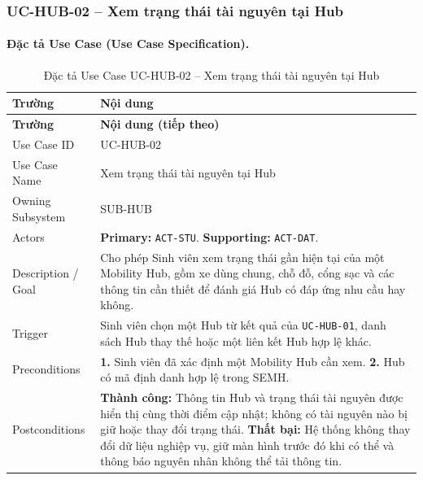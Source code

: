 \clearpage
\subsubsection{UC-HUB-02 -- Xem trạng thái tài nguyên tại Hub}


\paragraph{Đặc tả Use Case (Use Case Specification).}
\small
\begin{longtable}{|L{42mm}|L{102mm}|}
  \caption{Đặc tả Use Case UC-HUB-02 -- Xem trạng thái tài nguyên tại Hub}\label{tab:spec-UC-HUB-02}\\
  \hline
  \centering\arraybackslash\textbf{Trường} & \centering\arraybackslash\textbf{Nội dung}\\
  \hline
  \endfirsthead
  \hline
  \centering\arraybackslash\textbf{Trường} & \centering\arraybackslash\textbf{Nội dung (tiếp theo)}\\
  \hline
  \endhead
  Use Case ID & UC-HUB-02\\\hline
  Use Case Name & Xem trạng thái tài nguyên tại Hub\\\hline
  Owning Subsystem & SUB-HUB\\\hline
  Actors & \textbf{Primary:} \texttt{ACT-STU}. \textbf{Supporting:} \texttt{ACT-DAT}.\\\hline
  Description / Goal & Cho phép Sinh viên xem trạng thái gần hiện tại của một Mobility Hub, gồm xe dùng chung, chỗ đỗ, cổng sạc và các thông tin cần thiết để đánh giá Hub có đáp ứng nhu cầu hay không.\\\hline
  Trigger & Sinh viên chọn một Hub từ kết quả của \texttt{UC-HUB-01}, danh sách Hub thay thế hoặc một liên kết Hub hợp lệ khác.\\\hline
  Preconditions &
    \textbf{1.} Sinh viên đã xác định một Mobility Hub cần xem.\newline
    \textbf{2.} Hub có mã định danh hợp lệ trong SEMH.\\\hline
  Postconditions &
    \textbf{Thành công:} Thông tin Hub và trạng thái tài nguyên được hiển thị cùng thời điểm cập nhật; không có tài nguyên nào bị giữ hoặc thay đổi trạng thái.\newline
    \textbf{Thất bại:} Hệ thống không thay đổi dữ liệu nghiệp vụ, giữ màn hình trước đó khi có thể và thông báo nguyên nhân không thể tải thông tin.\\\hline

\end{longtable}
